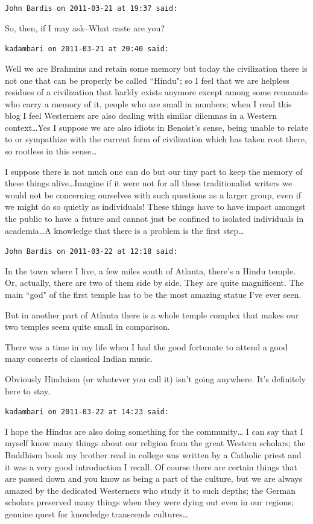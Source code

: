 \begin{footnotesize}
\begin{sffamily}
\hfill

\texttt{John Bardis on 2011-03-21 at 19:37 said: }

So, then, if I may ask–What caste are you?


\hfill

\texttt{kadambari on 2011-03-21 at 20:40 said: }

Well we are Brahmins and retain some memory but today the civilization there is not one that can be properly be called ``Hindu"; so I feel that we are helpless residues of a civilization that harldy exists anymore except among some remnants who carry a memory of it, people who are small in numbers; when I read this blog I feel Westerners are also dealing with similar dilemnas in a Western context…Yes I suppose we are also idiots in Benoist's sense, being unable to relate to or sympathize with the current form of civilization which has taken root there, so rootless in this sense…

I suppose there is not much one can do but our tiny part to keep the memory of these things alive…Imagine if it were not for all these traditionalist writers we would not be concerning ourselves with such questions as a larger group, even if we might do so quietly as individuals! These things have to have impact amongst the public to have a future and cannot just be confined to isolated individuals in academia…A knowledge that there is a problem is the first step…


\hfill

\texttt{John Bardis on 2011-03-22 at 12:18 said: }

In the town where I live, a few miles south of Atlanta, there's a Hindu temple. Or, actually, there are two of them side by side. They are quite magnificent. The main ``god" of the first temple has to be the most amazing statue I've ever seen.

But in another part of Atlanta there is a whole temple complex that makes our two temples seem quite small in comparison.

There was a time in my life when I had the good fortunate to attend a good many concerts of classical Indian music.

Obviously Hinduism (or whatever you call it) isn't going anywhere. It's definitely here to stay.


\hfill

\texttt{kadambari on 2011-03-22 at 14:23 said: }

I hope the Hindus are also doing something for the community… I can say that I myself know many things about our religion from the great Western scholars; the Buddhism book my brother read in college was written by a Catholic priest and it was a very good introduction I recall. Of course there are certain things that are passed down and you know as being a part of the culture, but we are always amazed by the dedicated Westerners who study it to such depths; the German scholars preserved many things when they were dying out even in our regions; genuine quest for knowledge transcends cultures…


\end{sffamily}
\end{footnotesize}
